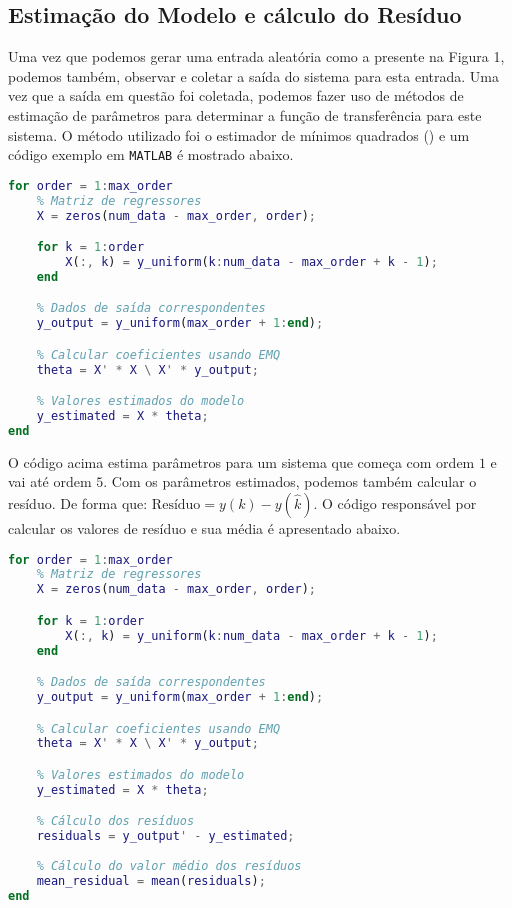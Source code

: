 \documentclass[a4paper,12pt]{article}
\begin{document}
\subsection{Estimação do Modelo e cálculo do Resíduo}\label{3.4}

Uma vez que podemos gerar uma entrada aleatória como a presente na Figura 1, podemos também, observar e coletar a saída do sistema para esta entrada. Uma vez que a saída em questão foi coletada, podemos fazer uso de métodos de estimação de parâmetros para determinar a função de transferência para este sistema. O método utilizado foi o estimador de mínimos quadrados () e um código exemplo em \texttt{MATLAB} é mostrado abaixo.

\begin{lstlisting}[language=Matlab, caption=Estimador de mínimos quadrados]
for order = 1:max_order
    % Matriz de regressores
    X = zeros(num_data - max_order, order);

    for k = 1:order
        X(:, k) = y_uniform(k:num_data - max_order + k - 1);
    end

    % Dados de saída correspondentes
    y_output = y_uniform(max_order + 1:end);

    % Calcular coeficientes usando EMQ
    theta = X' * X \ X' * y_output;

    % Valores estimados do modelo
    y_estimated = X * theta;
end
\end{lstlisting}

\newpage
O código acima estima parâmetros para um sistema que começa com ordem $1$ e vai até ordem $5$. Com os parâmetros estimados, podemos também calcular o resíduo. De forma que: $\text{Resíduo} = y(k) - y(\hat{k})$. O código responsável por calcular os valores de resíduo e sua média é apresentado abaixo.

\begin{lstlisting}[language=Matlab, caption=Calculo do resíduo e sua média]
for order = 1:max_order
    % Matriz de regressores
    X = zeros(num_data - max_order, order);

    for k = 1:order
        X(:, k) = y_uniform(k:num_data - max_order + k - 1);
    end

    % Dados de saída correspondentes
    y_output = y_uniform(max_order + 1:end);

    % Calcular coeficientes usando EMQ
    theta = X' * X \ X' * y_output;

    % Valores estimados do modelo
    y_estimated = X * theta;

    % Cálculo dos resíduos
    residuals = y_output' - y_estimated;
  
    % Cálculo do valor médio dos resíduos
    mean_residual = mean(residuals);
end
\end{lstlisting}
\end{document}

